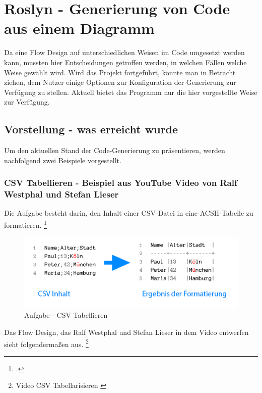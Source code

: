 \section{Roslyn - Generierung von Code aus einem Diagramm}

Da eine Flow Design auf unterschiedlichen Weisen im Code umgesetzt werden
kann, mussten hier Entscheidungen getroffen werden, in welchen Fällen
welche Weise gewählt wird. Wird das Projekt fortgeführt, könnte man in
Betracht ziehen, dem Nutzer einige Optionen zur Konfiguration der Generierung
zur Verfügung zu stellen. Aktuell bietet das Programm nur die hier vorgestellte Weise zur Verfügung.


\subsection{Vorstellung - was erreicht wurde}

Um den aktuellen Stand der Code-Generierung zu präsentieren, werden nachfolgend zwei Beispiele 
vorgestellt.

\subsubsection{CSV Tabellieren -  Beispiel aus YouTube Video von Ralf Westphal und Stefan Lieser}

Die Aufgabe besteht darin, den Inhalt einer CSV-Datei in eine ACSII-Tabelle zu formatieren.
\footcite[S.12]{kata}
\begin{figure}[H]
	\centering
	\includegraphics[width=0.8\linewidth]{./img/csvAufgabe.png}
	\caption{Aufgabe - CSV Tabellieren}
\end{figure}


Das Flow Design, das Ralf Westphal und Stefan Lieser in dem Video entwerfen sieht folgendermaßen aus. \footnote{Video CSV Tabellarisieren \cite{youtubevideos}}


